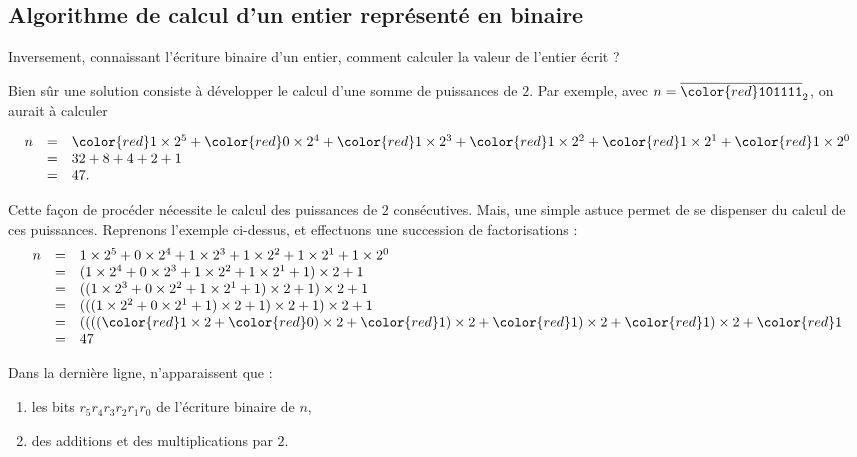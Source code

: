 \documentclass[class=report,crop=false]{standalone}
\begin{document}
\subsection{Algorithme de calcul d'un entier représenté en binaire}


Inversement, connaissant l'écriture binaire d'un entier, comment
calculer la valeur de l'entier écrit ?

Bien sûr une solution consiste à développer le calcul d'une somme de
puissances de $2$. Par exemple, avec $n = \overline{{\color{red}\mathtt{101111}}}_2$,
on aurait à calculer

\[\begin{array}{rcl}
n &=& 
{\color{red}1}\times 2^5 
+ {\color{red}0}\times 2^4 
+ {\color{red}1}\times 2^3 
+ {\color{red}1}\times 2^2 
+ {\color{red}1}\times 2^1 
+ {\color{red}1}\times 2^0\\
&=& 32 + 8 + 4 + 2 + 1\\
&=& 47.
\end{array}\]

Cette façon de procéder nécessite le calcul des puissances de $2$
consécutives. Mais, une simple astuce permet de se dispenser du calcul
de ces puissances. Reprenons l'exemple ci-dessus, et effectuons une 
succession de factorisations :
\[\begin{array}{rcl}
n &=& 1\times 2^5 + 0\times 2^4 + 1\times 2^3 + 1\times 2^2 + 1\times 2^1 + 1\times 2^0\\
&=& (1\times 2^4 + 0\times 2^3 + 1\times 2^2 + 1\times 2^1 + 1)\times 2 + 1\\
&=& ((1\times 2^3 + 0\times 2^2 + 1\times 2^1 + 1)\times 2 + 1)\times 2 + 1\\
&=& (((1\times 2^2 + 0\times 2^1 + 1)\times 2 + 1)\times 2 + 1)\times 2 + 1\\
&=& (((({\color{red}1}\times 2 + {\color{red}0})\times 2 + {\color{red}1})\times 2 + {\color{red}1})\times 2 + {\color{red}1})\times 2 + {\color{red}1} \\
&=& 47 \\
\end{array}\]

Dans la dernière ligne, n'apparaissent que :
\begin{enumerate}
\item les bits $r_5r_4r_3r_2r_1r_0$ de l'écriture binaire de $n$,
\item des additions et des multiplications par $2$.
\end{enumerate}
\end{document}
